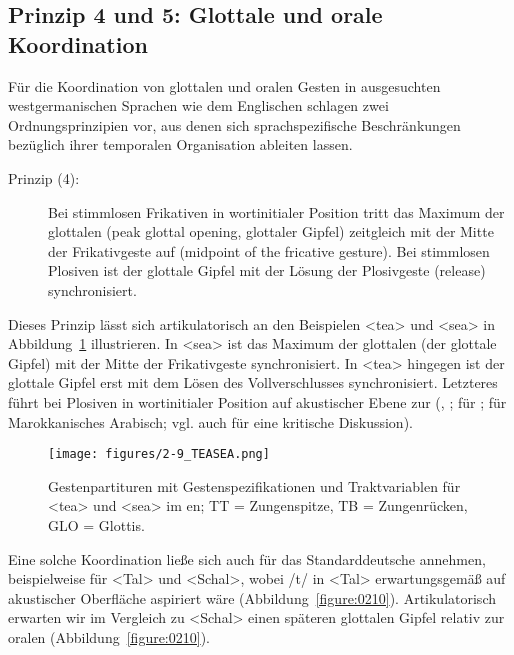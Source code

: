 \subsection{Prinzip 4 und 5: Glottale und orale Koordination}
\label{subsec:020201}

Für die Koordination von glottalen und oralen Gesten in ausgesuchten westgermanischen Sprachen wie dem Englischen schlagen \citet{Browman1992a} zwei Ordnungsprinzipien vor, aus denen sich sprachspezifische Beschränkungen bezüglich ihrer temporalen Organisation ableiten lassen.

\begin{description}
	\item[Prinzip (4):] Bei stimmlosen Frikativen in wortinitialer Position tritt das Maximum der glottalen  (peak glottal opening, glottaler Gipfel) zeitgleich mit der Mitte der Frikativgeste auf (midpoint of the fricative gesture). Bei stimmlosen Plosiven ist der glottale Gipfel mit der Lösung der Plosivgeste (release) synchronisiert.
\end{description}

Dieses Prinzip lässt sich artikulatorisch an den Beispielen <tea> und <sea> in Abbildung~\ref{figure:0209} illustrieren. In <sea> ist das Maximum der glottalen  (der glottale Gipfel) mit der Mitte der Frikativgeste synchronisiert. In <tea> hingegen ist der glottale Gipfel erst mit dem Lösen des Vollverschlusses synchronisiert. Letzteres führt bei Plosiven in wortinitialer Position auf akustischer Ebene zur  (\citealt{Browman1992a}, \citealt{Pouplier2011b}; \citealt{Yoshioka1981} für ; \citealt{Yeoul2008} für Marokkanisches Arabisch; vgl. auch \citealt{Hoole2006} für eine kritische Diskussion). 

\begin{figure}[t]
	\texttt{[image: figures/2-9\_TEASEA.png]}
	\caption{Gestenpartituren mit Gestenspezifikationen und Traktvariablen für <tea> und <sea> im en; TT = Zungenspitze, TB = Zungenrücken, GLO = Glottis.}
	\label{figure:0209}
\end{figure}

Eine solche Koordination ließe sich auch für das Standarddeutsche annehmen, beispielweise für <Tal> und <Schal>, wobei /t/ in <Tal> erwartungsgemäß auf akustischer Oberfläche aspiriert wäre (Abbildung~\ref{figure:0210}). Artikulatorisch erwarten wir im Vergleich zu <Schal> einen späteren glottalen Gipfel relativ zur oralen  (Abbildung~\ref{figure:0210}). 

